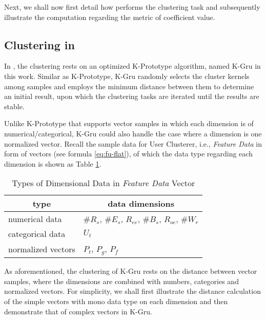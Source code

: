 Next, we shall now first detail how \sys{} performs the clustering task and subsequently illustrate the computation regarding the metric of coefficient value.

\subsection{Clustering in \sys{}}
\label{sec:cluster}

In \sys{}, the clustering rests on an optimized K-Prototype  algorithm, named K-Gru in this work.
Similar as K-Prototype, K-Gru randomly selects the cluster kernels among samples and employs the minimum distance between them to determine an initial result, upon which the clustering tasks are iterated until the results are stable.

Unlike K-Prototype that supports vector samples in which each dimension is of numerical/categorical, K-Gru could also handle the case where a dimension is one normalized vector.
%
Recall the sample data for User Clusterer, i.e., \textit{Feature Data} in form of vectors (see formula \ref{eq:fu-flat}), of which the data type regarding each dimension is shown as Table \ref{tbl:data-type}.

\begin{table}[!htb]
\centering
\begin{small}
\caption{Types of Dimensional Data in \textit{Feature Data} Vector}
\vspace{0.3cm}
\label{tbl:data-type}
\begin{tabular}{ll}
\toprule
\multicolumn{1}{c}{\textbf{type}} & \multicolumn{1}{c}{\textbf{data dimensions}}	\\	\midrule \midrule
numerical data				& $\#R_s$, $\#E_s$, $R_{ee}$, $\#B_s$, $R_{oc}$, $\#W_r$				\\	\midrule
categorical data			& $U_t$				\\	\midrule
normalized vectors			& $P_t$, $P_g$, $P_f$			\\ \bottomrule
\end{tabular}
\end{small}
\end{table}

As aforementioned, the clustering of K-Gru rests on the distance between vector samples, where the dimensions are combined with numbers, categories and normalized vectors.
For simplicity, we shall first illustrate the distance calculation of the simple vectors with mono data type on each dimension and then demonstrate that of complex vectors in K-Gru.


